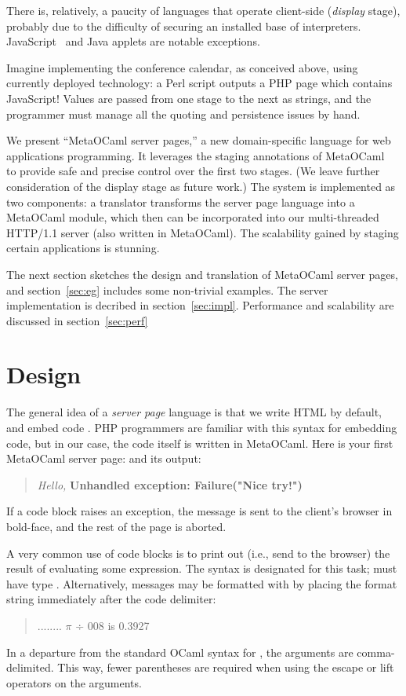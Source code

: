 \documentclass[preprint]{acm_proc_article-sp}
\def\MOC{MetaOCaml\xspace}
\begin{document}
There is, relatively, a paucity of languages that operate
client-side (\emph{display} stage), probably due to the
difficulty of securing an installed base of interpreters.
JavaScript~\cite{netscape-javascript} and Java applets are
notable exceptions.

Imagine implementing the conference calendar, as conceived
above, using currently deployed technology: a Perl script
outputs a PHP page which contains JavaScript!  Values are
passed from one stage to the next as strings, and the
programmer must manage all the quoting and persistence
issues by hand.

We present ``\MOC server pages,'' a new domain-specific language for
web applications programming.  It leverages the staging annotations of
\MOC~\cite{calcagno03meta,taha00metaml} to provide safe and precise
control over the first two stages.  (We leave further consideration of
the display stage as future work.)  The system is implemented as two
components: a translator transforms the server page language into a
\MOC module, which then can be incorporated into our multi-threaded
HTTP/1.1 server (also written in \MOC).  The scalability gained by
staging certain applications is stunning.

The next section sketches the design and translation of \MOC
server pages, and section~\ref{sec:eg} includes some non-trivial
examples.  The server implementation is decribed in
section~\ref{sec:impl}.  Performance and scalability are
discussed in section~\ref{sec:perf}

\section{Design}
\label{sec:design}

The general idea of a \emph{server page} language is that we
  write HTML by default, and embed code %
.
PHP programmers are familiar with this syntax for embedding code, but
in our case, the code itself is written in \MOC.  Here is your first
\MOC server page:
and its output:
\begin{quote}
  \textit{Hello,} \textbf{Unhandled exception: Failure("Nice try!")}
\end{quote}
If a code block raises an exception, the message is sent to the
client's browser in bold-face, and the rest of the page is
aborted. 

A very common use of code blocks is to print out (i.e., send to
the browser) the result of evaluating some expression.  The
syntax  is designated for this task;  must
have type .  Alternatively, messages may be formatted
with  by placing the format string immediately after
the code delimiter: 
\begin{quote}
  ........ $\pi$ ÷ 008 is 0.3927
\end{quote}
In a departure from the standard OCaml syntax for , the
arguments are comma-delimited.  This way, fewer parentheses are
required when using the escape or lift operators on the arguments.
\end{document}
